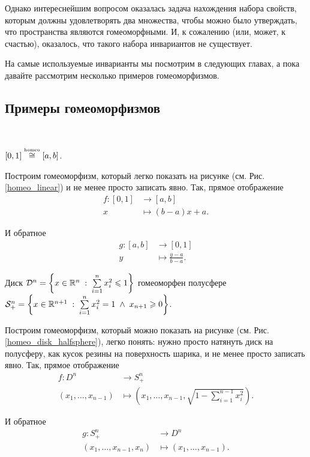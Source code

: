 Однако интереснейшим вопросом оказалась задача нахождения набора свойств, которым должны удовлетворять два множества, чтобы можно было утверждать, что пространства являются гомеоморфными. И, к сожалению (или, может, к счастью), оказалось, что такого набора инвариантов не существует.

На самые используемые инварианты мы посмотрим в следующих главах, а пока давайте рассмотрим несколько примеров гомеоморфизмов.

\subsection{Примеры гомеоморфизмов}

\

\begin{Ex}
    $[0,1] \overset{\text{\tiny homeo}}{\cong} [a,b]$.

    Построим гомеоморфизм, который легко показать на рисунке (см. Рис. \ref{homeo_linear}) и не менее просто записать явно.
    Так, прямое отображение 
    \[
        \begin{split}
            f: [0,1] &\to [a,b]\\
            x &\mapsto (b-a)x + a.
    \end{split}
    \] 

    И обратное 
    \[
    \begin{split}
        g: [a,b] &\to [0,1]\\
        y &\mapsto \frac{y-a}{b-a}.
    \end{split}
    \] 
\end{Ex}
\begin{Ex}
    Диск $\mathcal{D}^{n} = \left\{x\in \mathbb{R}^{n} \; : \; \sum\limits_{i=1}^{n} x_i^2 \leqslant  1\right\}$ гомеоморфен полусфере \\$\mathcal{S}^n_+ =  \left\{x\in \mathbb{R}^{n+1} \; : \; \sum\limits_{i=1}^{n} x_i^2 =  1  \; \land \; x_{n+1} \geqslant 0 \right\}$.

    Построим гомеоморфизм, который можно показать на рисунке (см. Рис. \ref{homeo_disk_halfsphere}), легко понять: нужно просто натянуть диск на полусферу, как кусок резины на поверхность шарика, и не менее просто записать явно.
    Так, прямое отображение 
    \[
    \begin{split}
        f: D^{n} &\to S^n_+\\
        (x_1, \dots, x_{n-1}) &\mapsto \left(x_1, \dots, x_{n-1}, \sqrt{1-\sum\limits_{i=1}^{n-1} x_i^2}\right).
    \end{split}
    \] 

    И обратное 
    \[
    \begin{split}
        g: S^n_+ &\to D^n\\
        (x_1, \dots, x_{n-1}, x_n) &\mapsto (x_1, \dots, x_{n-1}).
    \end{split}
    \] 
\end{Ex}
